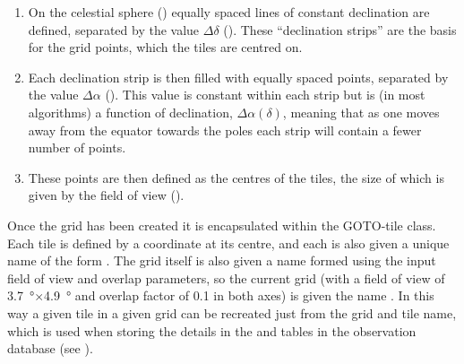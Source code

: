 \begin{colsection}
\begin{enumerate}
    \item On the celestial sphere () equally spaced lines of constant declination are defined, separated by the value $\Delta\delta$ (). These ``declination strips'' are the basis for the grid points, which the tiles are centred on.
    \item Each declination strip is then filled with equally spaced points, separated by the value $\Delta\alpha$ (). This value is constant within each strip but is (in most algorithms) a function of declination, $\Delta\alpha(\delta)$, meaning that as one moves away from the equator towards the poles each strip will contain a fewer number of points.
    \item These points are then defined as the centres of the tiles, the size of which is given by the field of view ().
\end{enumerate}

Once the grid has been created it is encapsulated within the GOTO-tile  class. Each tile is defined by a coordinate at its centre, and each is also given a unique name of the form . The grid itself is also given a name formed using the input field of view and overlap parameters, so the current  grid (with a field of view of \SI{3.7}{\degree}$\times$\SI{4.9}{\degree} and overlap factor of 0.1 in both axes) is given the name . In this way a given tile in a given grid can be recreated just from the grid and tile name, which is used when storing the details in the  and  tables in the observation database (see ). %

\newpage

\makeatletter
\setlength{\@fptop}{0pt}
\makeatother


\end{colsection}
